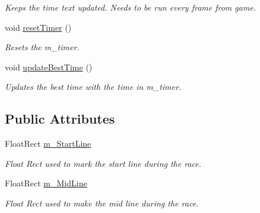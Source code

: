 \begin{DoxyCompactItemize}
\begin{DoxyCompactList}\small\item\em Keeps the time text updated. Needs to be run every frame from game. \end{DoxyCompactList}\item 
void \hyperlink{class_h_u_d_a489a9c8cb61422fa5f3256346e3fb3a9}{reset\+Timer} ()
\begin{DoxyCompactList}\small\item\em Resets the m\+\_\+timer. \end{DoxyCompactList}\item 
void \hyperlink{class_h_u_d_aff3c87dbcce63e0fb4136c18149f3a65}{update\+Best\+Time} ()
\begin{DoxyCompactList}\small\item\em Updates the best time with the time in m\+\_\+timer. \end{DoxyCompactList}\end{DoxyCompactItemize}
\subsection*{Public Attributes}
\begin{DoxyCompactItemize}
\item 
\hypertarget{class_h_u_d_a22d7ec3ed9526c49701e2fbe57c3a509}{}Float\+Rect \hyperlink{class_h_u_d_a22d7ec3ed9526c49701e2fbe57c3a509}{m\+\_\+\+Start\+Line}\label{class_h_u_d_a22d7ec3ed9526c49701e2fbe57c3a509}

\begin{DoxyCompactList}\small\item\em Float Rect used to mark the start line during the race. \end{DoxyCompactList}\item 
\hypertarget{class_h_u_d_a00ad3821cf2d266c31c5eb095ded60f1}{}Float\+Rect \hyperlink{class_h_u_d_a00ad3821cf2d266c31c5eb095ded60f1}{m\+\_\+\+Mid\+Line}\label{class_h_u_d_a00ad3821cf2d266c31c5eb095ded60f1}

\begin{DoxyCompactList}\small\item\em Float Rect used to make the mid line during the race. \end{DoxyCompactList}\end{DoxyCompactItemize}
